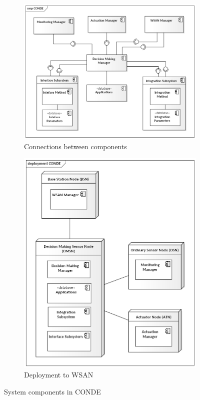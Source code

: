 \documentclass[11pt, english, a4paper, twoside]{article}
\begin{document}
\begin{figure}
	\centering
	\begin{subfigure}[b]{0.6\textwidth}
		\includegraphics[width=\textwidth]{CONDE.png}
		\caption{Connections between components}
		\label{fig:conde-connections}
	\end{subfigure}
    \hfill
    \begin{subfigure}[b]{0.35\textwidth}
		\centering
		\includegraphics[width=\textwidth]{CONDE-deployment.png}
		\caption{Deployment to WSAN}
		\label{fig:conde-deployment}
	\end{subfigure}
	\caption{System components in CONDE \cite{farias_control_2013}}
	\label{fig:conde}
\end{figure}
\end{document}
